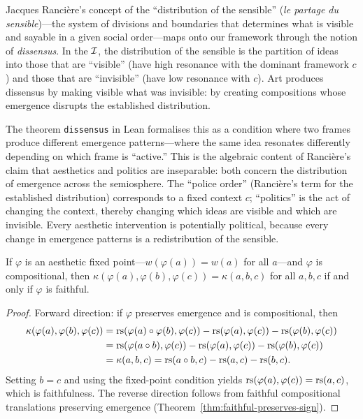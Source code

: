 \begin{remark}
\label{rem:ranciere-distribution}
Jacques Rancière's concept of the ``distribution of the sensible'' (\textit{le partage du sensible})---the system of divisions and boundaries that determines what is visible and sayable in a given social order---maps onto our framework through the notion of \emph{dissensus}.  In the $\mathcal{I}$, the distribution of the sensible is the partition of ideas into those that are ``visible'' (have high resonance with the dominant framework $c$) and those that are ``invisible'' (have low resonance with $c$).  Art produces dissensus by making visible what was invisible: by creating compositions whose emergence disrupts the established distribution.

The theorem \texttt{dissensus} in Lean formalises this as a condition where two frames produce different emergence patterns---where the same idea resonates differently depending on which frame is ``active.''  This is the algebraic content of Rancière's claim that aesthetics and politics are inseparable: both concern the distribution of emergence across the semiosphere.  The ``police order'' (Rancière's term for the established distribution) corresponds to a fixed context $c$; ``politics'' is the act of changing the context, thereby changing which ideas are visible and which are invisible.  Every aesthetic intervention is potentially political, because every change in emergence patterns is a redistribution of the sensible.
\end{remark}

\begin{theorem}
\label{thm:fixed-point-emergence}
If $\varphi$ is an aesthetic fixed point---$w(\varphi(a)) = w(a)$ for all $a$---and $\varphi$ is compositional, then $\kappa(\varphi(a), \varphi(b), \varphi(c)) = \kappa(a, b, c)$ for all $a, b, c$ if and only if $\varphi$ is faithful.
\end{theorem}

\begin{proof}
Forward direction: if $\varphi$ preserves emergence and is compositional, then
\begin{align*}
  \kappa(\varphi(a), \varphi(b), \varphi(c))
    &= \mathrm{rs}(\varphi(a) \circ \varphi(b), \varphi(c)) - \mathrm{rs}(\varphi(a), \varphi(c)) - \mathrm{rs}(\varphi(b), \varphi(c)) \\
    &= \mathrm{rs}(\varphi(a \circ b), \varphi(c)) - \mathrm{rs}(\varphi(a), \varphi(c)) - \mathrm{rs}(\varphi(b), \varphi(c)) \\
    &= \kappa(a, b, c) = \mathrm{rs}(a \circ b, c) - \mathrm{rs}(a, c) - \mathrm{rs}(b, c).
\end{align*}
Setting $b = c$ and using the fixed-point condition yields $\mathrm{rs}(\varphi(a), \varphi(c)) = \mathrm{rs}(a, c)$, which is faithfulness.  The reverse direction follows from faithful compositional translations preserving emergence (Theorem~\ref{thm:faithful-preserves-sign}).
\end{proof}

